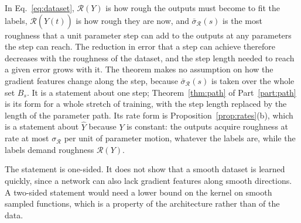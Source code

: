 \documentclass[11pt]{article}
\theoremstyle{definition}
\theoremstyle{remark}
\newcommand{\Rgh}{\mathcal{R}}           %
\newcommand{\sR}{\sigma_{\Rgh}}
\begin{document}
In Eq.~\eqref{eq:dataset}, $\Rgh(Y)$ is how rough the outputs must become to fit the labels, $\Rgh(\hat Y(t))$ is how rough they are now, and $\bar\sigma_\Rgh(s)$ is the most roughness that a unit parameter step can add to the outputs at any parameters the step can reach.
The reduction in error that a step can achieve therefore decreases with the roughness of the dataset, and the step length needed to reach a given error grows with it.
The theorem makes no assumption on how the gradient features change along the step, because $\bar\sigma_\Rgh(s)$ is taken over the whole set $B_s$.
It is a statement about one step; Theorem~\ref{thm:path} of Part~\ref{part:path} is its form for a whole stretch of training, with the step length replaced by the length of the parameter path.
Its rate form is Proposition~\ref{prop:rates}(b), which is a statement about $\hat Y$ because $Y$ is constant: the outputs acquire roughness at rate at most $\sR$ per unit of parameter motion, whatever the labels are, while the labels demand roughness $\Rgh(Y)$.

The statement is one-sided.
It does not show that a smooth dataset is learned quickly, since a network can also lack gradient features along smooth directions.
A two-sided statement would need a lower bound on the kernel on smooth sampled functions, which is a property of the architecture rather than of the data.
\end{document}
